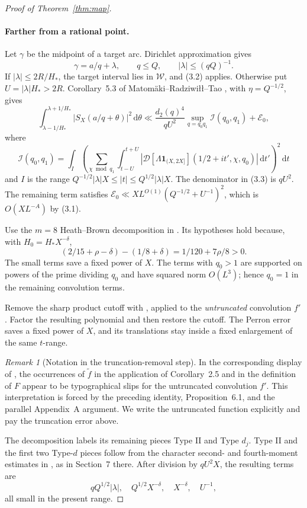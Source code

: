 \documentclass[11pt]{article}
\theoremstyle{remark}
\newtheorem{remark}[theorem]{Remark}
\newcommand{\1}{\mathbf 1}
\newcommand{\dd}{\,\mathrm d}
\begin{document}
\begin{proof}[Proof of Theorem~\ref{thm:map}]
\paragraph{Farther from a rational point.}
Let $\gamma$ be the midpoint of a target arc.  Dirichlet approximation gives
\[
 \gamma=a/q+\lambda,\qquad q\le Q,\qquad |\lambda|\le(qQ)^{-1}.
\]
If $|\lambda|\le2R/H_*$, the target interval lies in $\mathcal W$, and (3.2)
applies.  Otherwise put $U=|\lambda|H_*>2R$.  Corollary~5.3 of
Matom\"aki--Radziwi\l\l--Tao \cite{MRT2019}, with $\eta=Q^{-1/2}$, gives
\[
 \int_{\lambda-1/H_*}^{\lambda+1/H_*}|S_X(a/q+\theta)|^2\dd\theta
 \ll\frac{d_2(q)^4}{qU^2}\sup_{q=q_0q_1}\mathcal I(q_0,q_1)+\mathcal E_0,
 \tag{3.3}
\]
where
\[
 \mathcal I(q_0,q_1)=\int_I\left(
 \sum_{\chi\bmod q_1}\int_{t-U}^{t+U}
 |\mathcal D[\Lambda\1_{(X,2X]}](1/2+it',\chi,q_0)|\dd t'
 \right)^2\dd t
\]
and \(I\) is the range
$Q^{-1/2}|\lambda|X\le|t|\le Q^{1/2}|\lambda|X$.
The denominator in (3.3) is $qU^2$.  The remaining term satisfies
$\mathcal E_0\ll XL^{O(1)}(Q^{-1/2}+U^{-1})^2$, which is
$O(XL^{-A})$ by (3.1).

Use the $m=8$ Heath--Brown decomposition in
\cite[Lemmas~2.15--2.16]{MRT2019}.  Its hypotheses hold because, with
$H_0=H_*X^{-\delta}$,
\[
 (2/15+\rho-\delta)-(1/8+\delta)=1/120+7\rho/8>0.       \tag{3.4}
\]
The small terms save a fixed power of $X$.  The terms with $q_0>1$ are
supported on powers of the prime dividing $q_0$ and have squared norm
$O(L^3)$; hence \(q_0=1\) in the remaining convolution terms.

Remove the sharp product cutoff with
\cite[Corollary~2.5]{MRT2019}, applied to the \emph{untruncated}
convolution $f'$.  Factor the resulting polynomial and then restore the
cutoff.  The Perron error saves a fixed power of \(X\), and its translations
stay inside a fixed enlargement of the same \(t\)-range.

\begin{remark}[Notation in the truncation-removal step]
In the corresponding display of \cite[Section~6]{MRT2019}, the occurrences
of $\widetilde f$ in the application of Corollary~2.5 and in the definition
of $F$ appear to be typographical slips for the untruncated convolution
$f'$.  This interpretation is forced by the preceding identity,
Proposition~6.1, and the parallel Appendix~A argument.  We write the
untruncated function explicitly and pay the truncation error above.
\end{remark}

The decomposition labels its remaining pieces Type II and Type \(d_j\).
Type II and the first two Type-\(d\) pieces follow from the character second-
and fourth-moment estimates in \cite[Lemma~2.10 and Corollary~2.12]{MRT2019},
as in Section~7 there.  After
division by \(qU^2X\), the resulting terms are
\[
 qQ^{1/2}|\lambda|,\quad Q^{1/2}X^{-\delta},\quad
 X^{-\delta},\quad U^{-1},                              \tag{3.5}
\]
all small in the present range.


\end{proof}
\end{document}
